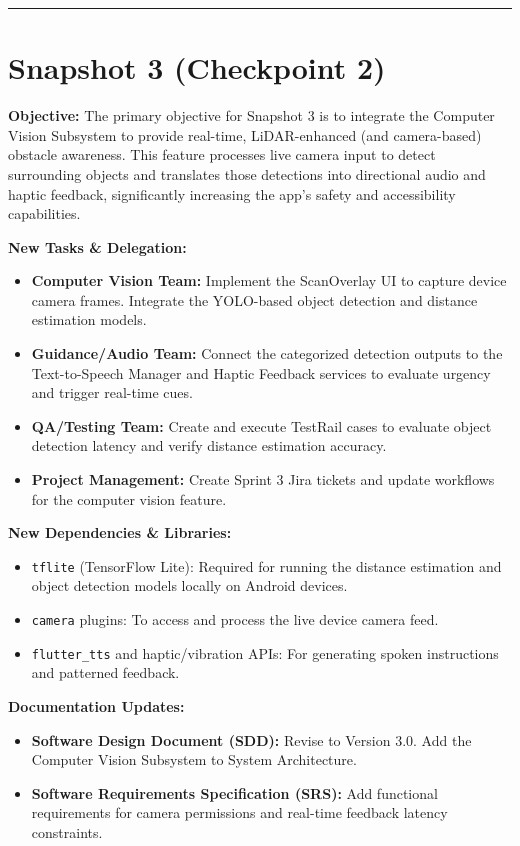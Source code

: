 \documentclass[12pt]{article}
\begin{document}
\vspace{0.5cm}
\hrule
\vspace{0.5cm}

\section*{Snapshot 3 (Checkpoint 2)}
\textbf{Objective:} 
The primary objective for Snapshot 3 is to integrate the Computer Vision Subsystem to provide real-time, LiDAR-enhanced (and camera-based) obstacle awareness. This feature processes live camera input to detect surrounding objects and translates those detections into directional audio and haptic feedback, significantly increasing the app's safety and accessibility capabilities.

\textbf{New Tasks \& Delegation:}
\begin{itemize}[noitemsep]
    \item \textbf{Computer Vision Team:} Implement the ScanOverlay UI to capture device camera frames. Integrate the YOLO-based object detection and distance estimation models.
    \item \textbf{Guidance/Audio Team:} Connect the categorized detection outputs to the Text-to-Speech Manager and Haptic Feedback services to evaluate urgency and trigger real-time cues.
    \item \textbf{QA/Testing Team:} Create and execute TestRail cases to evaluate object detection latency and verify distance estimation accuracy.
    \item \textbf{Project Management:} Create Sprint 3 Jira tickets and update workflows for the computer vision feature.
\end{itemize}

\textbf{New Dependencies \& Libraries:}
\begin{itemize}[noitemsep]
    \item \texttt{tflite} (TensorFlow Lite): Required for running the distance estimation and object detection models locally on Android devices.
    \item \texttt{camera} plugins: To access and process the live device camera feed.
    \item \texttt{flutter\_tts} and haptic/vibration APIs: For generating spoken instructions and patterned feedback.
\end{itemize}

\textbf{Documentation Updates:}
\begin{itemize}[noitemsep]
    \item \textbf{Software Design Document (SDD):} Revise to Version 3.0. Add the Computer Vision Subsystem to System Architecture.
    \item \textbf{Software Requirements Specification (SRS):} Add functional requirements for camera permissions and real-time feedback latency constraints.
\end{itemize}
\end{document}
